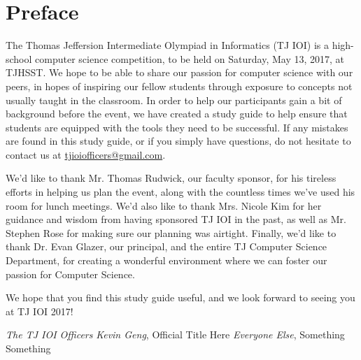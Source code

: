 \chapter{Preface}

The Thomas Jeffersion Intermediate Olympiad in Informatics (TJ IOI) is a high-school computer science competition, to be held on Saturday, May 13, 2017, at TJHSST.  We hope to be able to share our passion for computer science with our peers, in hopes of inspiring our fellow students through exposure to concepts not usually taught in the classroom.  In order to help our participants gain a bit of background before the event, we have created a study guide to help ensure that students are equipped with the tools they need to be successful.  If any mistakes are found in this study guide, or if you simply have questions, do not hesitate to contact us at \href{mailto:tjioiofficers@gmail.com}{tjioiofficers@gmail.com}.

We'd like to thank Mr. Thomas Rudwick, our faculty sponsor, for his tireless efforts in helping us plan the event, along with the countless times we've used his room for lunch meetings. We'd also like to thank Mrs. Nicole Kim for her guidance and wisdom from having sponsored TJ IOI in the past, as well as Mr. Stephen Rose for making sure our planning was airtight. Finally, we'd like to thank Dr. Evan Glazer, our principal, and the entire TJ Computer Science Department, for creating a wonderful environment where we can foster our passion for Computer Science.

We hope that you find this study guide useful, and we look forward to seeing you at TJ IOI 2017!

\textit{The TJ IOI Officers}
\textit{Kevin Geng}, Official Title Here
\textit{Everyone Else}, Something Something
